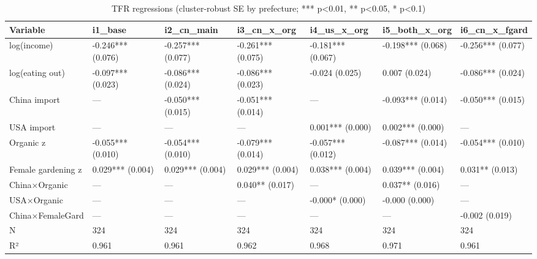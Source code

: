 \begin{table}
\caption{TFR regressions (cluster-robust SE by prefecture; *** p<0.01, ** p<0.05, * p<0.1)}
\label{tab:table2_imports_interactions}
\begin{tabular}{lllllll}
\toprule
Variable & i1\_base & i2\_cn\_main & i3\_cn\_x\_org & i4\_us\_x\_org & i5\_both\_x\_org & i6\_cn\_x\_fgard \\
\midrule
log(income) & -0.246*** (0.076) & -0.257*** (0.077) & -0.261*** (0.075) & -0.181*** (0.067) & -0.198*** (0.068) & -0.256*** (0.077) \\
log(eating out) & -0.097*** (0.023) & -0.086*** (0.024) & -0.086*** (0.023) & -0.024 (0.025) & 0.007 (0.024) & -0.086*** (0.024) \\
China import & — & -0.050*** (0.015) & -0.051*** (0.014) & — & -0.093*** (0.014) & -0.050*** (0.015) \\
USA import & — & — & — & 0.001*** (0.000) & 0.002*** (0.000) & — \\
Organic z & -0.055*** (0.010) & -0.054*** (0.010) & -0.079*** (0.014) & -0.057*** (0.012) & -0.087*** (0.014) & -0.054*** (0.010) \\
Female gardening z & 0.029*** (0.004) & 0.029*** (0.004) & 0.029*** (0.004) & 0.038*** (0.004) & 0.039*** (0.004) & 0.031** (0.013) \\
China×Organic & — & — & 0.040** (0.017) & — & 0.037** (0.016) & — \\
USA×Organic & — & — & — & -0.000* (0.000) & -0.000 (0.000) & — \\
China×FemaleGard & — & — & — & — & — & -0.002 (0.019) \\
N & 324 & 324 & 324 & 324 & 324 & 324 \\
R² & 0.961 & 0.961 & 0.962 & 0.968 & 0.971 & 0.961 \\
\bottomrule
\end{tabular}
\end{table}
